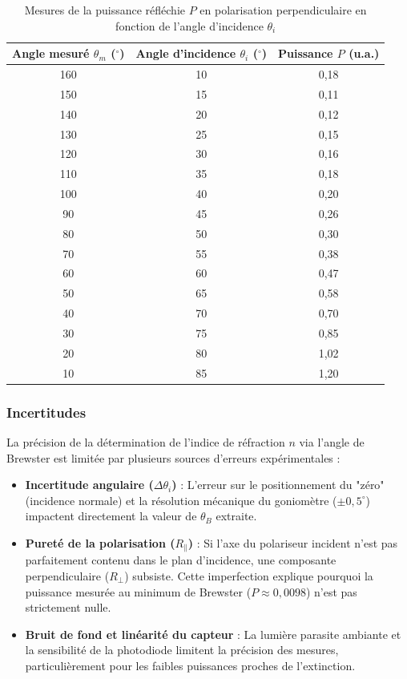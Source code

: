 \documentclass[a4paper,9pt,french]{scrartcl}
\begin{document}
\begin{table}[H]
\centering

\begin{tabular}{|c|c|c|}
\hline
\textbf{Angle mesuré $\theta_m$ ($^\circ$)} & \textbf{Angle d'incidence $\theta_i$ ($^\circ$)} & \textbf{Puissance $P$ (u.a.)} \\ \hline
160 & 10 & 0,18 \\ \hline
150 & 15 & 0,11 \\ \hline
140 & 20 & 0,12 \\ \hline
130 & 25 & 0,15 \\ \hline
120 & 30 & 0,16 \\ \hline
110 & 35 & 0,18 \\ \hline
100 & 40 & 0,20 \\ \hline
90  & 45 & 0,26 \\ \hline
80  & 50 & 0,30 \\ \hline
70  & 55 & 0,38 \\ \hline
60  & 60 & 0,47 \\ \hline
50  & 65 & 0,58 \\ \hline
40  & 70 & 0,70 \\ \hline
30  & 75 & 0,85 \\ \hline
20  & 80 & 1,02 \\ \hline
10  & 85 & 1,20 \\ \hline
\end{tabular}
\caption{Mesures de la puissance réfléchie $P$ en polarisation perpendiculaire en fonction de l'angle d'incidence $\theta_i$}
\label{tab:perpendiculaire_data}
\end{table}
\subsubsection{Incertitudes}
La précision de la détermination de l'indice de réfraction $n$ via l'angle de Brewster est limitée par plusieurs sources d'erreurs expérimentales :

\begin{itemize}
    \item \textbf{Incertitude angulaire ($\Delta \theta_i$)} : L'erreur sur le positionnement du "zéro" (incidence normale) et la résolution mécanique du goniomètre ($\pm 0,5^\circ$) impactent directement la valeur de $\theta_B$ extraite. 
    
    \item \textbf{Pureté de la polarisation ($R_\parallel$)} : Si l'axe du polariseur incident n'est pas parfaitement contenu dans le plan d'incidence, une composante perpendiculaire ($R_\perp$) subsiste. Cette imperfection explique pourquoi la puissance mesurée au minimum de Brewster ($P \approx 0,0098$) n'est pas strictement nulle.
    
    \item \textbf{Bruit de fond et linéarité du capteur} : La lumière parasite ambiante et la sensibilité de la photodiode limitent la précision des mesures, particulièrement pour les faibles puissances proches de l'extinction.
\end{itemize}
\end{document}

